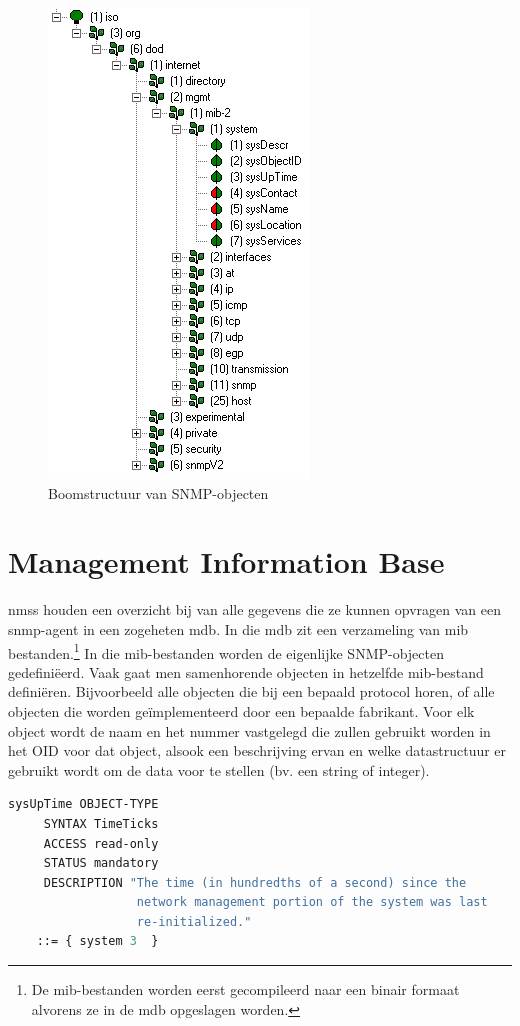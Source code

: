 \begin{figure}[h]
	\centering
	\includegraphics{figures/snmp/OID_tree}
	\caption{Boomstructuur van SNMP-objecten}
	\label{boomstructuur}
\end{figure}


\section{Management Information Base}
\Glspl{nms} houden een overzicht bij van alle gegevens die ze kunnen opvragen van een \gls{snmp-agent} in een zogeheten \gls{mdb}.
In die \gls{mdb} zit een verzameling van \gls{mib} bestanden.\footnote{De \gls{mib}-bestanden worden eerst gecompileerd naar een binair formaat %
alvorens ze in de \gls{mdb} opgeslagen worden.\cite{moreau}}
In die \gls{mib}-bestanden worden de eigenlijke SNMP-objecten gedefiniëerd. Vaak gaat men samenhorende objecten in hetzelfde \gls{mib}-bestand definiëren.
Bijvoorbeeld alle objecten die bij een bepaald protocol horen, of alle objecten die worden geïmplementeerd door een bepaalde fabrikant.
Voor elk object wordt de naam en het nummer vastgelegd die zullen gebruikt worden in het OID voor dat object, alsook een beschrijving ervan en
welke datastructuur er gebruikt wordt om de data voor te stellen (bv. een string of integer).

\begin{lstlisting}[language=asn.1, float=h, caption={Definitie van een SNMP-object}, label=lst-definitie-snmp-obj]
sysUpTime OBJECT-TYPE 
	 SYNTAX TimeTicks
	 ACCESS read-only
	 STATUS mandatory
	 DESCRIPTION "The time (in hundredths of a second) since the 
                  network management portion of the system was last 
                  re-initialized."
 	::= { system 3  }
\end{lstlisting}

